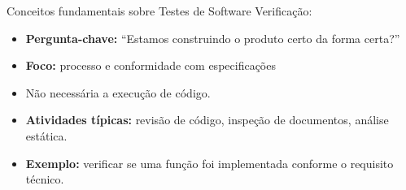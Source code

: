 \begin{frame}{Conceitos fundamentais sobre Testes de Software}
    Verificação:
    \begin{itemize}
        \item \textbf{Pergunta-chave:}  “Estamos construindo o produto certo da forma certa?”
        \item \textbf{Foco:} processo e conformidade com especificações
        \item Não necessária a execução de código.
        \item \textbf{Atividades típicas:} revisão de código, inspeção de documentos, análise estática.
        \item \textbf{Exemplo:} verificar se uma função foi implementada conforme o requisito técnico.
    \end{itemize}
\end{frame}